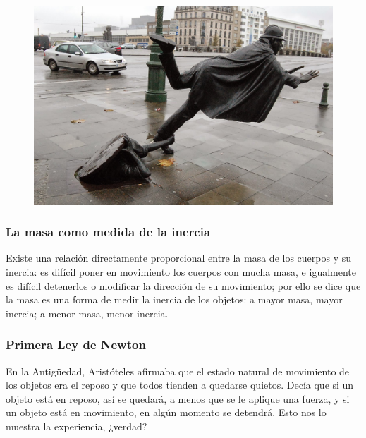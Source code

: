 \documentclass[11pt]{book}
\begin{document}
\begin{figure}[H]
  \centering
  \includegraphics[width=0.4\linewidth]{tropiezo.jpeg}
  \label{fig:tropiezo}
\end{figure}


\subsubsection{La masa como medida de la inercia}

Existe una relación directamente proporcional entre la masa de los cuerpos y su inercia:
es difícil poner en movimiento los cuerpos con mucha masa, e igualmente es
difícil detenerlos o modificar la dirección de su movimiento; por ello se dice que la masa
es una forma de medir la inercia de los objetos: a mayor masa, mayor inercia; a menor masa,
menor inercia.

\subsubsection{Primera Ley de Newton}

En la Antig\"uedad, Aristóteles afirmaba que el estado natural de movimiento de los
objetos era el reposo y que todos tienden a quedarse quietos. Decía que si un objeto
está en reposo, así se quedará, a menos que se le aplique una fuerza, y si un objeto
está en movimiento, en algún momento se detendrá. Esto nos lo muestra la experiencia, ¿verdad?\\
\end{document}
